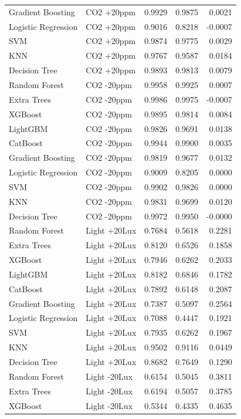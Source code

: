 \begin{tabular}{llrrr}
Gradient Boosting & CO2 +20ppm & 0.9929 & 0.9875 & 0.0021 \\
Logistic Regression & CO2 +20ppm & 0.9016 & 0.8218 & -0.0007 \\
SVM & CO2 +20ppm & 0.9874 & 0.9775 & 0.0029 \\
KNN & CO2 +20ppm & 0.9767 & 0.9587 & 0.0184 \\
Decision Tree & CO2 +20ppm & 0.9893 & 0.9813 & 0.0079 \\
Random Forest & CO2 -20ppm & 0.9958 & 0.9925 & 0.0007 \\
Extra Trees & CO2 -20ppm & 0.9986 & 0.9975 & -0.0007 \\
XGBoost & CO2 -20ppm & 0.9895 & 0.9814 & 0.0084 \\
LightGBM & CO2 -20ppm & 0.9826 & 0.9691 & 0.0138 \\
CatBoost & CO2 -20ppm & 0.9944 & 0.9900 & 0.0035 \\
Gradient Boosting & CO2 -20ppm & 0.9819 & 0.9677 & 0.0132 \\
Logistic Regression & CO2 -20ppm & 0.9009 & 0.8205 & 0.0000 \\
SVM & CO2 -20ppm & 0.9902 & 0.9826 & 0.0000 \\
KNN & CO2 -20ppm & 0.9831 & 0.9699 & 0.0120 \\
Decision Tree & CO2 -20ppm & 0.9972 & 0.9950 & -0.0000 \\
Random Forest & Light +20Lux & 0.7684 & 0.5618 & 0.2281 \\
Extra Trees & Light +20Lux & 0.8120 & 0.6526 & 0.1858 \\
XGBoost & Light +20Lux & 0.7946 & 0.6262 & 0.2033 \\
LightGBM & Light +20Lux & 0.8182 & 0.6846 & 0.1782 \\
CatBoost & Light +20Lux & 0.7892 & 0.6148 & 0.2087 \\
Gradient Boosting & Light +20Lux & 0.7387 & 0.5097 & 0.2564 \\
Logistic Regression & Light +20Lux & 0.7088 & 0.4447 & 0.1921 \\
SVM & Light +20Lux & 0.7935 & 0.6262 & 0.1967 \\
KNN & Light +20Lux & 0.9502 & 0.9116 & 0.0449 \\
Decision Tree & Light +20Lux & 0.8682 & 0.7649 & 0.1290 \\
Random Forest & Light -20Lux & 0.6154 & 0.5045 & 0.3811 \\
Extra Trees & Light -20Lux & 0.6194 & 0.5057 & 0.3785 \\
XGBoost & Light -20Lux & 0.5344 & 0.4335 & 0.4635 \\

\end{tabular}
